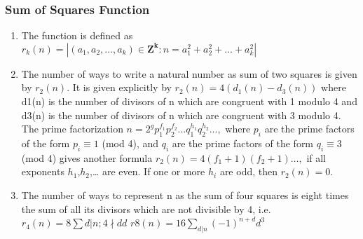 \subsubsection{Sum of Squares Function}\begin{enumerate}

            
            \item The function is defined as
                $r_{k}\left(n\right) = \left|{\left(a_{1},a_{2},…,a_{k} \right) \in \mathbf{Z^{k}} :
                n=a_{1}^{2}+a_{2}^{2}+…+a_{k}^{2}}\right|$
            \item The number of ways to write a natural number as sum of two squares is given by $r_2(n)$. It is given
                explicitly
                by
                $r_{2}\left(n\right) = 4\left(d_{1}\left(n\right) - d_{3}\left(n\right)\right)$
                where d1(n) is the number of divisors of n which are congruent with 1 modulo 4 and d3(n) is the number
                of
                divisors of n which are congruent with 3 modulo 4.  
                The prime factorization $n = 2^{g}p_{1}^{f_{1}}p_{2}^{f_{2}}. . .q_{1}^{h_{1}}q_{2}^{h_{2}}. . . ,$
                where
                $\displaystyle p_{i}$ are the prime factors of the form $\displaystyle p_{i} \equiv 1$ (mod 4), and
                $q_{i}$
                are
                the prime factors of the form $q_{i} \equiv 3$ (mod 4) gives another formula $r_{2}\left(n\right) =
                4\left(f_{1}+1\right)\left(f_{2}+1\right)…,$ if all exponents $h_{1}$,$h_{2}$,… are even. If one or more
                $h_{i}$
                are odd, then $r_{2}\left(n\right) = 0.$
            \item 
                The number of ways to represent n as the sum of four squares is eight times the sum of all its
                    divisors
                    which
                    are not divisible by 4, i.e.
                    $r_{4}\left( n \right) = 8 \displaystyle\sum {d| n;4 \nmid d}d$ 
                        $r{8}\left(n\right) = 16 \displaystyle\sum _{d|n} \left(-1\right)^{n+d}d^{3}$

            
        \end{enumerate}
